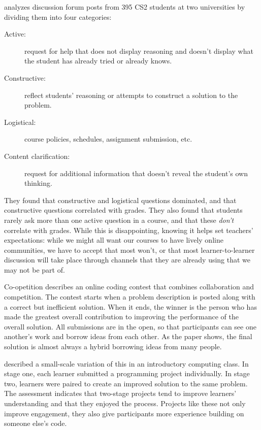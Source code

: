 \cite{Vell2017} analyzes discussion forum posts from 395 CS2 students at two universities
by dividing them into four categories:

\begin{description}

\item[Active:]
  request for help that does not display reasoning
  and doesn't display what the student has already tried or already knows.

\item[Constructive:]
  reflect students' reasoning
  or attempts to construct a solution to the problem.

\item[Logistical:]
  course policies, schedules, assignment submission, etc.

\item[Content clarification:]
  request for additional information
  that doesn't reveal the student's own thinking.

\end{description}

They found that constructive and logistical questions dominated,
and that constructive questions correlated with grades.
They also found that students rarely ask more than one active question in a course,
and that these \emph{don't} correlate with grades.
While this is disappointing,
knowing it helps set teachers' expectations:
while we might all want our courses to have lively online communities,
we have to accept that most won't,
or that most learner-to-learner discussion will take place
through channels that they are already using
that we may not be part of.

\begin{aside}{Co-opetition}
  \cite{Gull2004} describes an online coding contest that combines collaboration and competition.
  The contest starts when a problem description is posted along with a correct but inefficient solution.
  When it ends,
  the winner is the person who has made the greatest overall contribution
  to improving the performance of the overall solution.
  All submissions are in the open,
  so that participants can see one another's work and borrow ideas from each other.
  As the paper shows,
  the final solution is almost always a hybrid borrowing ideas from many people.

  \cite{Batt2018} described a small-scale variation of this in an introductory computing class.
  In stage one,
  each learner submitted a programming project individually.
  In stage two,
  learners were paired to create an improved solution to the same problem.
  The assessment indicates that two-stage projects tend to improve learners' understanding
  and that they enjoyed the process.
  Projects like these not only improve engagement,
  they also give participants more experience building on someone else's code.
\end{aside}

